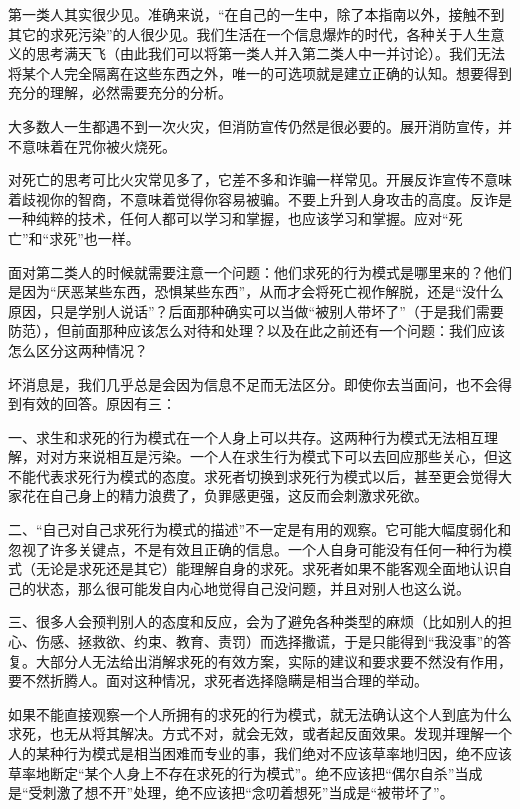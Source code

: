 第一类人其实很少见。准确来说，“在自己的一生中，除了本指南以外，接触不到其它的求死污染”的人很少见。我们生活在一个信息爆炸的时代，各种关于人生意义的思考满天飞（由此我们可以将第一类人并入第二类人中一并讨论）。我们无法将某个人完全隔离在这些东西之外，唯一的可选项就是建立正确的认知。想要得到充分的理解，必然需要充分的分析。
\begin{examples}
大多数人一生都遇不到一次火灾，但消防宣传仍然是很必要的。展开消防宣传，并不意味着在咒你被火烧死。

对死亡的思考可比火灾常见多了，它差不多和诈骗一样常见。开展反诈宣传不意味着歧视你的智商，不意味着觉得你容易被骗。不要上升到人身攻击的高度。反诈是一种纯粹的技术，任何人都可以学习和掌握，也应该学习和掌握。应对“死亡”和“求死”也一样。
\end{examples}
面对第二类人的时候就需要注意一个问题：他们求死的行为模式是哪里来的？他们是因为“厌恶某些东西，恐惧某些东西”，从而才会将死亡视作解脱，还是“没什么原因，只是学别人说话”？后面那种确实可以当做“被别人带坏了”（于是我们需要防范），但前面那种应该怎么对待和处理？以及在此之前还有一个问题：我们应该怎么区分这两种情况？
\begin{explain}
\label{para:无效沟通}坏消息是，我们几乎总是会因为信息不足而无法区分。即使你去当面问，也不会得到有效的回答。原因有三：

一、求生和求死的行为模式在一个人身上可以共存。这两种行为模式无法相互理解，对对方来说相互是污染。一个人在求生行为模式下可以去回应那些关心，但这不能代表求死行为模式的态度。求死者切换到求死行为模式以后，甚至更会觉得大家花在自己身上的精力浪费了，负罪感更强，这反而会刺激求死欲。

二、“自己对自己求死行为模式的描述”不一定是有用的观察。它可能大幅度弱化和忽视了许多关键点，不是有效且正确的信息。一个人自身可能没有任何一种行为模式（无论是求死还是其它）能理解自身的求死。求死者如果不能客观全面地认识自己的状态，那么很可能发自内心地觉得自己没问题，并且对别人也这么说。

三、很多人会预判别人的态度和反应，会为了避免各种类型的麻烦（比如别人的担心、伤感、拯救欲、约束、教育、责罚）而选择撒谎，于是只能得到“我没事”的答复。大部分人无法给出消解求死的有效方案，实际的建议和要求要不然没有作用，要不然折腾人。面对这种情况，求死者选择隐瞒是相当合理的举动。
\end{explain}
如果不能直接观察一个人所拥有的求死的行为模式，就无法确认这个人到底为什么求死，也无从将其解决。方式不对，就会无效，或者起反面效果。发现并理解一个人的某种行为模式是相当困难而专业的事，我们绝对不应该草率地归因，绝不应该草率地断定“某个人身上不存在求死的行为模式”。绝不应该把“偶尔自杀”当成是“受刺激了想不开”处理，绝不应该把“念叨着想死”当成是“被带坏了”。

